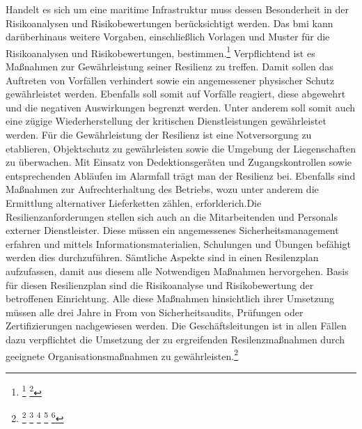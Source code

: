\documentclass[11pt,a4paper,hidelinks]{article}   %
\begin{document}
                Handelt es sich um eine maritime Infrastruktur muss dessen Besonderheit in der Risikoanalysen und Risikobewertungen berücksichtigt werden. Das \gls{bmi} kann darüberhinaus weitere Vorgaben, einschließlich Vorlagen und Muster für die Risikoanalysen und Risikobewertungen, bestimmen.\footnote{
                    \footcite[Vgl. §11, Absatz 2,][]{KRITIS-DachG}
                    \footcite[Vgl. §12,][]{KRITIS-DachG}
                } Verpflichtend ist es Maßnahmen zur Gewährleistung seiner Resilienz zu treffen. Damit sollen das Auftreten von Vorfällen verhindert sowie ein angemessener physischer Schutz gewährleistet werden. Ebenfalls soll somit auf Vorfälle reagiert, diese abgewehrt und die negativen Auswirkungen begrenzt werden. Unter anderem soll somit auch eine zügige Wiederherstellung der kritischen Dienstleistungen gewährleistet werden. Für die Gewährleistung der Resilienz ist eine Notversorgung zu etablieren, Objektschutz zu gewährleisten sowie die Umgebung der Liegenschaften zu überwachen. Mit Einsatz von Dedektionsgeräten und Zugangskontrollen sowie entsprechenden Abläufen im Alarmfall trägt man der Resilienz bei. Ebenfalls sind Maßnahmen zur Aufrechterhaltung des Betriebs, wozu unter anderem die Ermittlung alternativer Lieferketten zählen, erforlderich.Die Resilienzanforderungen stellen sich auch an die Mitarbeitenden und Personals externer Dienstleister. Diese müssen ein angemessenes Sicherheitsmanagement erfahren und mittels Informationsmaterialien, Schulungen und Übungen befähigt werden dies durchzuführen. Sämtliche Aspekte sind in einen Resilenzplan aufzufassen, damit aus diesem alle Notwendigen Maßnahmen hervorgehen. Basis für diesen Resilienzplan sind die Risikoanalyse und Risikobewertung der betroffenen Einrichtung. Alle diese Maßnahmen hinsichtlich ihrer Umsetzung müssen alle drei Jahre in From von Sicherheitsaudits, Prüfungen oder Zertifizierungen nachgewiesen werden. Die Geschäftsleitungen ist in allen Fällen dazu verpflichtet die Umsetzung der zu ergreifenden Resilenzmaßnahmen durch geeignete Organisationsmaßnahmen zu gewährleisten.\footnote{
                    \footcite[Vgl. §13,][]{KRITIS-DachG}
                    \footcite[Vgl. §14, Absatz 2,][]{KRITIS-DachG}
                    \footcite[Vgl. §16,][]{KRITIS-DachG}
                    \footcite[Vgl. §20, Absatz 1][]{KRITIS-DachG}
                    \footcite[Vgl. §39, Absatz 1,][]{NIS2UmsuCG}
                }
\end{document}
